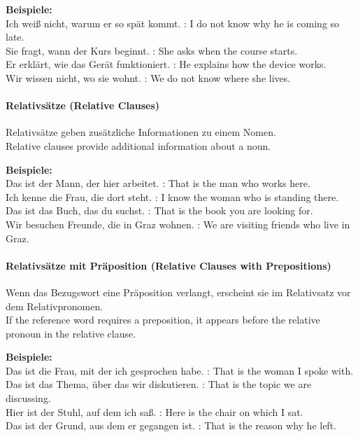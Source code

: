 \documentclass[a4paper]{article}
\begin{document}
            \textbf{Beispiele:}\\
            Ich weiß nicht, warum er so spät kommt. : I do not know why he is coming so late.\\
            Sie fragt, wann der Kurs beginnt. : She asks when the course starts.\\
            Er erklärt, wie das Gerät funktioniert. : He explains how the device works.\\
            Wir wissen nicht, wo sie wohnt. : We do not know where she lives.
        
        \paragraph{Relativsätze {\small (Relative Clauses)}}
            Relativsätze geben zusätzliche Informationen zu einem Nomen.\\
            Relative clauses provide additional information about a noun.
            
            \textbf{Beispiele:}\\
            Das ist der Mann, der hier arbeitet. : That is the man who works here.\\
            Ich kenne die Frau, die dort steht. : I know the woman who is standing there.\\
            Das ist das Buch, das du suchst. : That is the book you are looking for.\\
            Wir besuchen Freunde, die in Graz wohnen. : We are visiting friends who live in Graz.
        
        \paragraph{Relativsätze mit Präposition {\small (Relative Clauses with Prepositions)}}
            Wenn das Bezugswort eine Präposition verlangt, erscheint sie im Relativsatz vor dem Relativpronomen.\\
            If the reference word requires a preposition, it appears before the relative pronoun in the relative clause.
            
            \textbf{Beispiele:}\\
            Das ist die Frau, mit der ich gesprochen habe. : That is the woman I spoke with.\\
            Das ist das Thema, über das wir diskutieren. : That is the topic we are discussing.\\
            Hier ist der Stuhl, auf dem ich saß. : Here is the chair on which I sat.\\
            Das ist der Grund, aus dem er gegangen ist. : That is the reason why he left.
        
\end{document}
